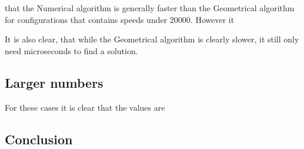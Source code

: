  

 that the Numerical algorithm is generally faster than the Geometrical algorithm for configurations that contains speeds under 20000. However it 

It is also clear, that while the Geometrical algorithm is clearly slower, it still only need microseconds to find a solution. 

\subsection{Larger numbers}
 
For these cases it is clear that the values are 

\subsection{Conclusion}
